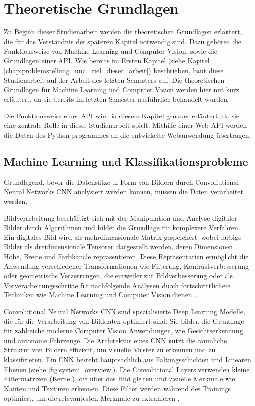 \chapter{Theoretische Grundlagen} \label{chap:theoretische_grundlagen}  %
Zu Beginn dieser Studienarbeit werden die theoretischen Grundlagen erläutert, die für das Verständnis der späteren Kapitel notwendig sind. Dazu gehören die Funktionsweise von Machine Learning und Computer Vision, sowie die Grundlagen einer API.
Wie bereits im Ersten Kapitel (siehe Kapitel \ref{chap:problemstellung_und_ziel_dieser_arbeit}) beschrieben, baut diese Studienarbeit auf der Arbeit des letzten Semesters auf. 
Die theoretischen Grundlagen für Machine Learning und Computer Vision werden hier nut kurz erläutert, da sie bereits im letzten Semester ausführlich behandelt wurden.

Die Funktionsweise einer API wird in diesem Kapitel genauer erläutert, da sie eine zentrale Rolle in dieser Studienarbeit spielt. Mithilfe einer Web-API werden die Daten
des Python programmes an die entwickelte Webanwendung übertragen.

\section{Machine Learning und Klassifikationsprobleme} \label{sec:ml_cv}  %
Grundlegend, bevor die Datensätze in Form von Bildern durch Convoliutional Neural Networks \ac{CNN} analysiert werden können, müssen die Daten verarbeitet werden.

Bildverarbeitung beschäftigt sich mit der Manipulation und Analyse digitaler Bilder durch Algorithmen und bildet die Grundlage für komplexere Verfahren. 
Ein digitales Bild wird als mehrdimensionale Matrix gespeichert, wobei farbige Bilder als dreidimensionale Tensoren 
dargestellt werden, deren Dimensionen Höhe, Breite und Farbkanäle repräsentieren. 
Diese Repräsentation ermöglicht die Anwendung verschiedener Transformationen wie Filterung, Kontrastverbesserung oder geometrische Verzerrungen, die 
entweder zur Bildverbesserung oder als Vorverarbeitungsschritte für nachfolgende Analysen durch fortschrittlichere Techniken wie Machine Learning und Computer Vision dienen \cite{finbridgede_computer_2022}.

Convolutional Neural Networks \ac{CNN} sind spezialisierte Deep Learning Modelle, die für die Verarbeitung von Bilddaten optimiert sind. Sie bilden die Grundlage für zahlreiche moderne Computer Vision Anwendungen, wie Gesichtserkennung und autonome Fahrzeuge. 
Die Architektur eines CNN nutzt die räumliche Struktur von Bildern effizient, um visuelle Muster zu erkennen und zu klassifizieren.
Ein CNN besteht hauptsächlich aus Faltungsschichten und Linearen Ebenen (siehe \autoref{fig:system_overview}). 
Die Convolutional Layers verwenden kleine Filtermatrizen (Kernel), die über das Bild gleiten und visuelle Merkmale wie Kanten und Texturen erkennen. 
Diese Filter werden während des Trainings optimiert, um die relevantesten Merkmale zu extrahieren \cite{finbridgede_computer_2022} \cite{intel_convolutional_nodate}.


